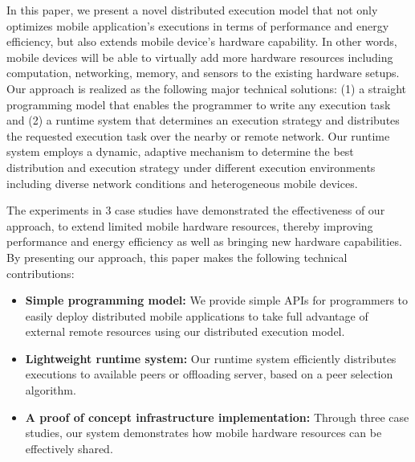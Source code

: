 \documentclass{sig-alternate}[10pt]
\begin{document}
In this paper, we present a novel distributed execution model that not only optimizes mobile application's executions in terms of performance and energy efficiency, but also extends mobile device's hardware capability. In other words, mobile devices will be able to virtually add more hardware resources including computation, networking, memory, and sensors to the existing hardware setups. Our approach is realized as the following major technical solutions: (1) a straight programming model that enables the programmer to write any execution task and (2) a runtime system that determines an execution strategy and distributes the requested execution task over the nearby or remote network. Our runtime system employs a dynamic, adaptive mechanism to determine the best distribution and execution strategy under different execution environments including diverse network conditions and heterogeneous mobile devices.

The experiments in 3 case studies have demonstrated the effectiveness of our approach, to extend limited mobile hardware resources, thereby improving performance and energy efficiency as well as bringing new hardware capabilities. By presenting our approach, this paper makes the following technical contributions:
\begin{itemize}
	\item \textbf{Simple programming model:} We provide simple APIs for programmers to easily deploy distributed mobile applications to take full advantage of external remote resources using our distributed execution model.
	\item \textbf{Lightweight runtime system:} Our runtime system efficiently distributes executions to available peers or offloading server, based on a peer selection algorithm. 	
	\item \textbf{A proof of concept infrastructure implementation:} Through three case studies, our system demonstrates how mobile hardware resources can be effectively shared.
\end{itemize}

\end{document}
